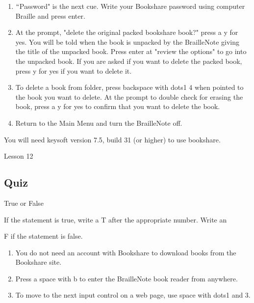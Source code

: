 \documentclass[10pt,letterpaper,twoside]{report}
\begin{document}
{{{{\begin{enumerate}
	\item $``$Password" is the next cue.  Write your Bookshare password using computer Braille and press enter.
	      
	\item At the prompt, "delete the original packed bookshare book?" press a y for yes.  You will be told when the book is unpacked by the BrailleNote giving the title of the unpacked book.  Press enter at "review the options" to go into the unpacked book.  If you are asked if you want to delete the packed book, press y for yes if you want to delete it.
	      
	\item To delete a book from folder, press backspace with dots1 4 when pointed to the book you want to delete.  At the prompt to double check for erasing the book, press a y for yes to confirm that you want to delete the book.
	      
	\item Return to the Main Menu and turn the BrailleNote off.
\end{enumerate}



You will need keysoft version 7.5, build 31 (or higher) to use bookshare.



\clearpage

\newpage
Lesson 12

\subsection{Quiz}



True or False



If the statement is true, write a T after the appropriate number.  Write an

F if the statement is false.



\begin{enumerate}
	\item You do not need an account with Bookshare to download books from the Bookshare site.
	      
	\item Press a space with b to enter the BrailleNote book reader from anywhere.
	      
	\item To move to the next input control on a web page, use space with dots1 and 3.
	      

\end{enumerate}}}}}
\end{document}
